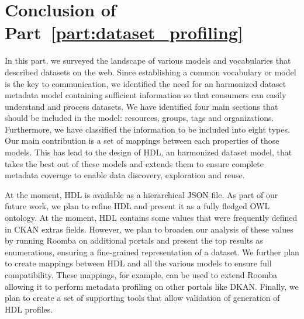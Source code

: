 \chapter*{Conclusion of Part~\ref{part:dataset_profiling}}

In this part, we surveyed the landscape of various models and vocabularies that described datasets on the web. Since establishing a common vocabulary or model is the key to communication, we identified the need for an harmonized dataset metadata model containing sufficient information so that consumers can easily understand and process datasets. We have identified four main sections that should be included in the model: resources, groups, tags and organizations. Furthermore, we have classified the information to be included into eight types. Our main contribution is a set of mappings between each properties of those models. This has lead to the design of HDL, an harmonized dataset model, that takes the best out of these models and extends them to ensure complete metadata coverage to enable data discovery, exploration and reuse.

At the moment, HDL is available as a hierarchical JSON file. As part of our future work, we plan to refine HDL and present it as a fully fledged OWL ontology. At the moment, HDL contains some values that were frequently defined in CKAN extras fields. However, we plan to broaden our analysis of these values by running Roomba on additional portals and present the top results as enumerations, ensuring a fine-grained representation of a dataset. We further plan to create mappings between HDL and all the various models to ensure full compatibility. These mappings, for example, can be used to extend Roomba allowing it to perform metadata profiling on other portals like DKAN. Finally, we plan to create a set of supporting tools that allow validation of generation of HDL profiles.



